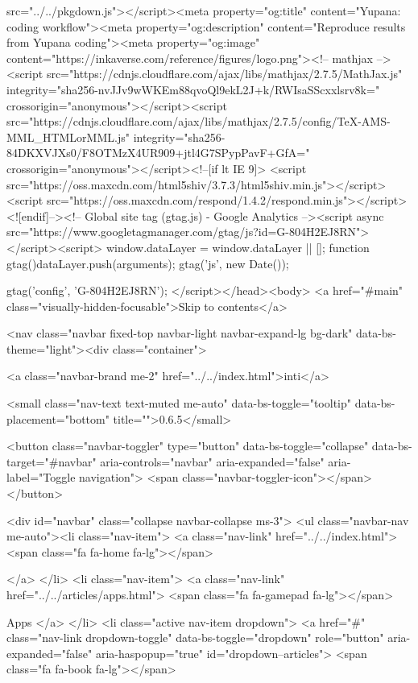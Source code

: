 src="../../pkgdown.js"></script><meta property="og:title" content="Yupana: coding workflow"><meta property="og:description" content="Reproduce results from Yupana coding"><meta property="og:image" content="https://inkaverse.com/reference/figures/logo.png"><!-- mathjax --><script src="https://cdnjs.cloudflare.com/ajax/libs/mathjax/2.7.5/MathJax.js" integrity="sha256-nvJJv9wWKEm88qvoQl9ekL2J+k/RWIsaSScxxlsrv8k=" crossorigin="anonymous"></script><script src="https://cdnjs.cloudflare.com/ajax/libs/mathjax/2.7.5/config/TeX-AMS-MML_HTMLorMML.js" integrity="sha256-84DKXVJXs0/F8OTMzX4UR909+jtl4G7SPypPavF+GfA=" crossorigin="anonymous"></script><!--[if lt IE 9]>
<script src="https://oss.maxcdn.com/html5shiv/3.7.3/html5shiv.min.js"></script>
<script src="https://oss.maxcdn.com/respond/1.4.2/respond.min.js"></script>
<![endif]--><!-- Global site tag (gtag.js) - Google Analytics --><script async src="https://www.googletagmanager.com/gtag/js?id=G-804H2EJ8RN"></script><script>
  window.dataLayer = window.dataLayer || [];
  function gtag(){dataLayer.push(arguments);}
  gtag('js', new Date());

  gtag('config', 'G-804H2EJ8RN');
</script></head><body>
    <a href="#main" class="visually-hidden-focusable">Skip to contents</a>
    

    <nav class="navbar fixed-top navbar-light navbar-expand-lg bg-dark" data-bs-theme="light"><div class="container">
    
    <a class="navbar-brand me-2" href="../../index.html">inti</a>

    <small class="nav-text text-muted me-auto" data-bs-toggle="tooltip" data-bs-placement="bottom" title="">0.6.5</small>

    
    <button class="navbar-toggler" type="button" data-bs-toggle="collapse" data-bs-target="#navbar" aria-controls="navbar" aria-expanded="false" aria-label="Toggle navigation">
      <span class="navbar-toggler-icon"></span>
    </button>

    <div id="navbar" class="collapse navbar-collapse ms-3">
      <ul class="navbar-nav me-auto"><li class="nav-item">
  <a class="nav-link" href="../../index.html">
    <span class="fa fa-home fa-lg"></span>
     
  </a>
</li>
<li class="nav-item">
  <a class="nav-link" href="../../articles/apps.html">
    <span class="fa fa-gamepad fa-lg"></span>
     
    Apps
  </a>
</li>
<li class="active nav-item dropdown">
  <a href="#" class="nav-link dropdown-toggle" data-bs-toggle="dropdown" role="button" aria-expanded="false" aria-haspopup="true" id="dropdown--articles">
    <span class="fa fa-book fa-lg"></span>
     
